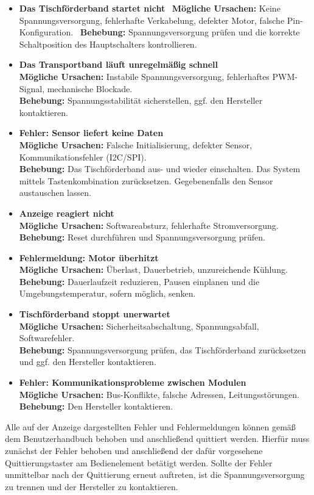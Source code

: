 \begin{itemize}
	\item \textbf{Das Tischförderband startet nicht} \
	\textbf{Mögliche Ursachen:} Keine Spannungsversorgung, fehlerhafte Verkabelung, defekter Motor, falsche Pin-Konfiguration. \
	\textbf{Behebung:} Spannungsversorgung prüfen und die korrekte Schaltposition des Hauptschalters kontrollieren.
	
	\item \textbf{Das Transportband läuft unregelmäßig schnell} \\
	\textbf{Mögliche Ursachen:} Instabile Spannungsversorgung, fehlerhaftes PWM-Signal, mechanische Blockade. \\
	\textbf{Behebung:} Spannungsstabilität sicherstellen, ggf. den Hersteller kontaktieren. 
	
	\item \textbf{Fehler: \glqq Sensor liefert keine Daten\grqq} \\
	\textbf{Mögliche Ursachen:} Falsche Initialisierung, defekter Sensor, Kommunikationsfehler (I2C/SPI). \\
	\textbf{Behebung:} Das Tischförderband aus- und wieder einschalten. Das System mittels Tastenkombination zurücksetzen. Gegebenenfalls den Sensor austauschen lassen. 
	
	\item \textbf{Anzeige reagiert nicht} \\
	\textbf{Mögliche Ursachen:} Softwareabsturz, fehlerhafte Stromversorgung. \\
	\textbf{Behebung:} Reset durchführen und Spannungsversorgung prüfen.
	
	\item \textbf{Fehlermeldung: \glqq Motor überhitzt\grqq} \\
	\textbf{Mögliche Ursachen:} Überlast, Dauerbetrieb, unzureichende Kühlung. \\
	\textbf{Behebung:} Dauerlaufzeit reduzieren, Pausen einplanen und die Umgebungstemperatur, sofern möglich, senken. 
	
	\item \textbf{Tischförderband stoppt unerwartet} \\
	\textbf{Mögliche Ursachen:} Sicherheitsabschaltung, Spannungsabfall, Softwarefehler. \\
	\textbf{Behebung:} Spannungsversorgung prüfen, das Tischförderband zurücksetzen und ggf. den Hersteller kontaktieren.
	
	\item \textbf{Fehler: \glqq Kommunikationsprobleme zwischen Modulen\grqq} \\
	\textbf{Mögliche Ursachen:} Bus-Konflikte, falsche Adressen, Leitungsstörungen. \\
	\textbf{Behebung:} Den Hersteller kontaktieren.  
	
\end{itemize}
Alle auf der Anzeige dargestellten Fehler und Fehlermeldungen können gemäß dem Benutzerhandbuch behoben und anschließend quittiert werden. Hierfür muss zunächst der Fehler behoben und anschließend der dafür vorgesehene Quittierungstaster am Bedienelement betätigt werden. Sollte der Fehler unmittelbar nach der Quittierung erneut auftreten, ist die Spannungsversorgung zu trennen und der Hersteller zu kontaktieren.
